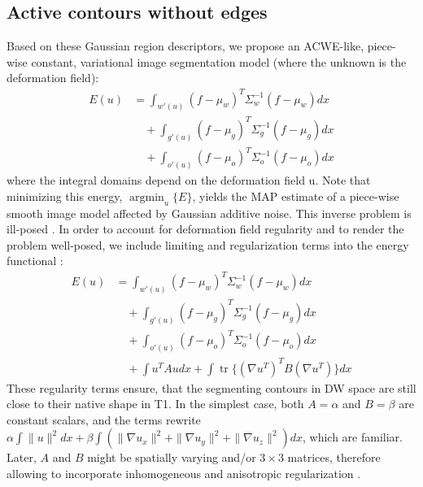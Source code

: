 \documentclass[a4paper,12pt]{article}
\DeclareMathOperator{\tr}{tr}
\DeclareMathOperator{\argmin}{argmin}
\begin{document}
\subsection{Active contours without edges}
Based on these Gaussian region descriptors, we propose an ACWE-like, piece-wise constant, variational image segmentation model (where the unknown is the deformation field)\cite{Chan2001}:
\begin{align}
E(u) &= \int_{w'(u)} (f-\mu_w)^T\Sigma_w^{-1}(f-\mu_w) dx\nonumber\\
&\quad +\int_{g'(u)} (f-\mu_g)^T\Sigma_g^{-1}(f-\mu_g) dx\\
&\quad +\int_{o'(u)} (f-\mu_o)^T\Sigma_o^{-1}(f-\mu_o) dx\nonumber
\end{align}
where the integral domains depend on the deformation field u. Note that minimizing this energy, $\argmin_u\{E\}$, yields the MAP estimate of a piece-wise smooth image model affected by Gaussian additive noise. This inverse problem is ill-posed \cite{Hadamard1902,Bertero1988}. In order to account for deformation field regularity and to render the problem well-posed, we include limiting and regularization terms into the energy functional \cite{Tichonov1963,Morozov1975}:
\begin{align}
E(u) &= \int_{w'(u)} (f-\mu_w)^T\Sigma_w^{-1}(f-\mu_w) dx\nonumber\\
&\quad +\int_{g'(u)} (f-\mu_g)^T\Sigma_g^{-1}(f-\mu_g) dx\\
&\quad +\int_{o'(u)} (f-\mu_o)^T\Sigma_o^{-1}(f-\mu_o) dx\nonumber\\
&\quad +\int u^T A u dx + \int \tr\{(\nabla u^T)^T B (\nabla u^T)\} dx\nonumber
\end{align}
These regularity terms ensure, that the segmenting contours in DW space are still close to their native shape in T1. In the simplest case, both $A=\alpha$ and $B=\beta$ are constant scalars, and the terms rewrite $\alpha \int  \|u\|^2 dx + \beta \int \left( \|\nabla u_x\|^2 + \|\nabla u_y\|^2 + \|\nabla u_z\|^2\right) dx$, which are familiar. Later, $A$ and $B$ might be spatially varying and/or $3\times 3$ matrices, therefore allowing to incorporate inhomogeneous and anisotropic regularization \cite{Nagel1986}.
\end{document}
